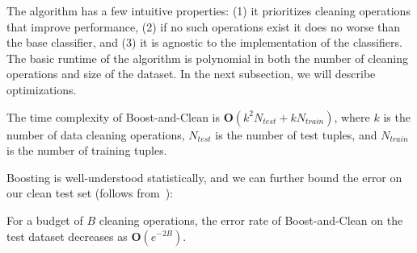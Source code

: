 The algorithm has a few intuitive properties: (1) it prioritizes cleaning operations that improve performance, (2) if no such operations exist it does no worse than the base classifier, and (3) it is agnostic to the implementation of the classifiers.
The basic runtime of the algorithm is polynomial in both the number of cleaning operations and size of the dataset. In the next subsection, we will describe optimizations.

\begin{proposition}
The time complexity of Boost-and-Clean is $\mathbf{O}(k^2 N_{test} + k N_{train})$, where $k$ is the number of data cleaning operations, $N_{test}$ is the number of test tuples, and $N_{train}$ is the number of training tuples.
\end{proposition}

Boosting is well-understood statistically, and we can further bound the error on our clean test set (follows from~\cite{schapire2003boosting}):

\begin{proposition}
For a budget of $B$ cleaning operations, the error rate of Boost-and-Clean on the test dataset decreases as $\mathbf{O}(e^{-2B})$.
\end{proposition}


